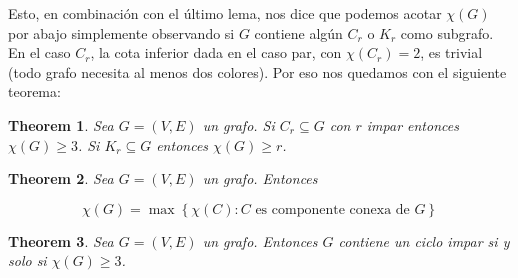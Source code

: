 \documentclass[a4paper, 12pt]{article}
\newtheorem{theorem}{Theorem}
\newtheorem{theorem}{Theorem}
\begin{document}
Esto, en combinación con el último lema, nos dice que podemos acotar $\chi(G)$
por abajo simplemente observando si $G$ contiene algún $C_r$  o $K_r$ como
subgrafo. En el caso $C_r$, la cota inferior dada en el caso par, con $\chi(C_r)
= 2$, es trivial (todo grafo necesita al menos dos colores). Por eso nos
quedamos con el siguiente teorema: 

\begin{theorem}
    Sea $G = (V, E) $ un grafo. Si $C_r \subseteq G$ con $r$ impar entonces
    $\chi(G) \geq 3$. Si $K_r \subseteq G$ entonces $\chi(G) \geq r$.
\end{theorem}

\begin{theorem}
    
    Sea $G = (V, E) $ un grafo. Entonces 

    $$\chi(G) = \max \left\{ \chi(C) : C \text{ es componente
conexa de  } G \right\} $$

\end{theorem}


\begin{theorem}
    Sea $G = (V, E) $ un grafo. Entonces $G$ contiene un ciclo impar si y solo
    si $\chi(G) \geq 3$.
\end{theorem}
\end{document}
